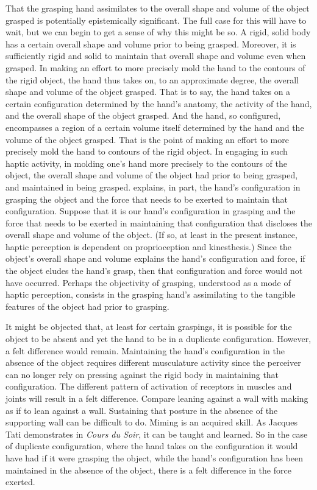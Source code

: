 \documentclass[12pt]{article}
\begin{document}
That the grasping hand assimilates to the overall shape and volume of the object grasped is potentially epistemically significant. The full case for this will have to wait, but we can begin to get a sense of why this might be so. A rigid, solid body has a certain overall shape and volume prior to being grasped. Moreover, it is sufficiently rigid and solid to maintain that overall shape and volume even when grasped. In making an effort to more precisely mold the hand to the contours of the rigid object, the hand thus takes on, to an approximate degree, the overall shape and volume of the object grasped. That is to say, the hand takes on a certain configuration determined by the hand's anatomy, the activity of the hand, and the overall shape of the object grasped. And the hand, so configured, encompasses a region of a certain volume itself determined by the hand and the volume of the object grasped. That is the point of making an effort to more precisely mold the hand to contours of the rigid object. In engaging in such haptic activity, in molding one's hand more precisely to the contours of the object, the overall shape and volume of the object had prior to being grasped, and maintained in being grasped. explains, in part, the hand's configuration in grasping the object and the force that needs to be exerted to maintain that configuration. Suppose that it is our hand's configuration in grasping and the force that needs to be exerted in maintaining that configuration that discloses the overall shape and volume of the object. (If so, at least in the present instance, haptic perception is dependent on proprioception and kinesthesis.) Since the object's overall shape and volume explains the hand's configuration and force, if the object eludes the hand's grasp, then that configuration and force would not have occurred. Perhaps the objectivity of grasping, understood as a mode of haptic perception, consists in the grasping hand's assimilating to the tangible features of the object had prior to grasping.

It might be objected that, at least for certain graspings, it is possible for the object to be absent and yet the hand to be in a duplicate configuration. However, a felt difference would remain. Maintaining the hand's configuration in the absence of the object requires different musculature activity since the perceiver can no longer rely on pressing against the rigid body in maintaining that configuration. The different pattern of activation of receptors in muscles and joints will result in a felt difference. Compare leaning against a wall with making as if to lean against a wall. Sustaining that posture in the absence of the supporting wall can be difficult to do. Miming is an acquired skill. As Jacques Tati demonstrates in \emph{Cours du Soir}, it can be taught and learned. So in the case of duplicate configuration, where the hand takes on the configuration it would have had if it were grasping the object, while the hand's configuration has been maintained in the absence of the object, there is a felt difference in the force exerted.
\end{document}
